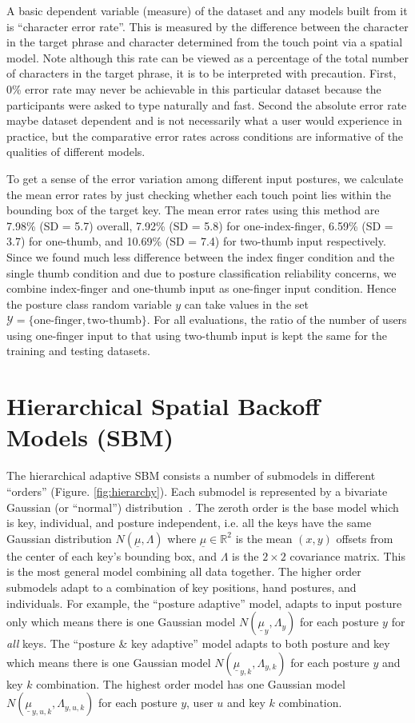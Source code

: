 \documentclass{sigchi}
\begin{document}
A basic dependent variable (measure) of the dataset and any models built from it
is ``character error rate''. This is measured by the difference between the
character in the target phrase and character determined from the touch point via
a spatial model. Note although this rate can be viewed as a percentage of the 
total number of characters in the target phrase, it is to be interpreted with 
precaution. First, 0\% error rate may never be achievable in this
particular dataset because the participants were asked to type naturally and
fast. Second the absolute error rate maybe dataset dependent and is not
necessarily what a user would experience in practice, but the comparative error rates across conditions are informative of the qualities 
of different models.

To get a sense of the error variation among different input postures, we
calculate the mean error rates by just checking whether each touch point lies within the
bounding box of the target key. The mean error rates using this method are
7.98\% (SD = 5.7) overall, 7.92\% (SD = 5.8) for one-index-finger, 6.59\% (SD =
3.7) for one-thumb, and 10.69\% (SD = 7.4) for two-thumb input respectively.
Since we found much less difference between the index finger condition and the single thumb condition and due to posture classification reliability concerns, we combine index-finger and one-thumb input as one-finger input condition. Hence the posture class random variable $y$ can take values in the set $\mathcal{Y} = \{\text{one-finger}, \text{two-thumb}\}$.
For all evaluations, the ratio of the number of users using one-finger input to 
that using two-thumb input is kept the same for the training and testing datasets.

\section{Hierarchical Spatial Backoff Models (SBM)}
The hierarchical adaptive SBM consists a number of submodels in different
``orders'' (Figure. \ref{fig:hierarchy}). Each submodel is represented by a
bivariate Gaussian  (or ``normal'') distribution~\cite{Azenkot:2012,
Goodman:2002, Rashid:2008}.
The zeroth order is the base model which is key, individual, and posture
independent, i.e. all the keys have the same Gaussian
distribution $N(\underline\mu, \Lambda)$ where $\underline\mu \in \mathbb{R}^2$ is the mean
$(x, y)$ offsets from the center of each key's bounding box, and $\Lambda$ is
the $2\times 2$ covariance matrix. This is the most general model combining all data together. The higher order submodels adapt to a combination of 
key positions, hand postures, and individuals. For example, the ``posture adaptive'' model, adapts to input posture only which means there is one Gaussian model $N(\underline\mu_y, \Lambda_y)$ for each posture $y$ for \textit{all} keys. The ``posture \& key adaptive'' model adapts to both posture and key which means there is one Gaussian model $N(\underline\mu_{y, k}, \Lambda_{y, k})$ for each posture $y$ and key $k$ combination.  The highest order model has one Gaussian model $N(\underline\mu_{y,u,k}, \Lambda_{y,u,k})$ for each posture $y$, user $u$ and key $k$ combination.
\end{document}
